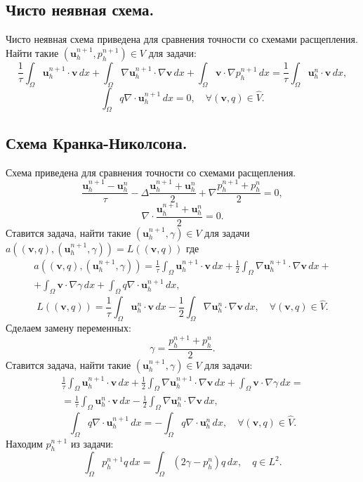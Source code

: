 \documentclass[12pt]{article}
\begin{document}
\subsection{Чисто неявная схема.} Чисто неявная схема приведена для сравнения точности со схемами расщепления. Найти такие $({\bm u}_h^{n+1}, p_h^{n+1}) \in V$ для задачи:
$$
\frac{1}{\tau} \int_\Omega {\bm u_h^{n+1}} \cdot {\bm v} \, dx + \int_\Omega \nabla {\bm u_h^{n+1}} \cdot \nabla {\bm v} \, dx + \int_\Omega {\bm v} \cdot \nabla p_h^{n+1} \, dx = \frac{1}{\tau} \int_\Omega {\bm u}_h^n \cdot {\bm v} \, dx, 
$$
$$
\int_\Omega q \nabla \cdot {\bm u_h^{n+1}} \, dx = 0, \quad \forall ({\bm v},q) \in \hat V.
$$

\subsection{Схема Кранка-Николсона.} Схема приведена для сравнения точности со схемами расщепления.
$$
\frac{{\bm u}_h^{n+1}-{\bm u}_h^n}{\tau} - \Delta \frac{{\bm u}_h^{n+1}+{\bm u}_h^n}{2}+\nabla \frac{p_h^{n+1}+p_h^n}{2}=0,
$$
$$
\nabla \cdot \frac{{\bm u}_h^{n+1}+{\bm u}_h^{n}}{2}=0.
$$
Ставится задача, найти такие $({\bm u}_h^{n+1}, \gamma) \in V$ для задачи $a(({\bm v},q), ({\bm u}_h^{n+1},\gamma)) = L(({\bm v},q))$ где
\begin{eqnarray}
a(({\bm v}, q), ({\bm u}_h^{n+1}, \gamma)) = \frac{1}{\tau} \int_\Omega {\bm u_h^{n+1}} \cdot {\bm v} \, dx + \frac{1}{2} \int_\Omega \nabla {\bm u_h^{n+1}} \cdot \nabla {\bm v} \, dx + \nonumber\\ 
+ \int_\Omega {\bm v} \cdot \nabla \gamma \, dx + \int_\Omega q \nabla \cdot {\bm u_h^{n+1}} \, dx,
\end{eqnarray}
$$
L(({\bm v},q)) = \frac{1}{\tau} \int_\Omega {\bm u}_h^n \cdot {\bm v} \, dx - \frac{1}{2} \int_\Omega \nabla {\bm u}_h^n \cdot \nabla {\bm v} \, dx, \quad \forall ({\bm v},q) \in \hat V.
$$
Сделаем замену переменных:
$$
\gamma = \frac{p_h^{n+1} + p_h^{n}}{2}.
$$
Ставится задача, найти такие $({\bm u}_h^{n+1}, \gamma) \in V$ для задачи:
\begin{eqnarray}
\frac{1}{\tau} \int_\Omega {\bm u_h^{n+1}} \cdot {\bm v} \, dx + \frac{1}{2} \int_\Omega \nabla {\bm u_h^{n+1}} \cdot \nabla {\bm v} \, dx + \int_\Omega {\bm v} \cdot \nabla \gamma \, dx = \nonumber\\  = \frac{1}{\tau} \int_\Omega {\bm u}_h^n \cdot {\bm v} \, dx - \frac{1}{2} \int_\Omega \nabla {\bm u}_h^n \cdot \nabla {\bm v} \, dx,
\end{eqnarray}
$$
\int_\Omega q \nabla \cdot {\bm u_h^{n+1}} \, dx = - \int_\Omega q \nabla \cdot {\bm u_h^{n}} \, dx, \quad \forall ({\bm v},q) \in \hat V.
$$
Находим $p_h^{n+1}$ из задачи:
$$
\int_\Omega p_h^{n+1} q \, dx = \int_\Omega (2\gamma - p_h^{n}) q \, dx, \quad q \in L^2.
$$
\end{document}
